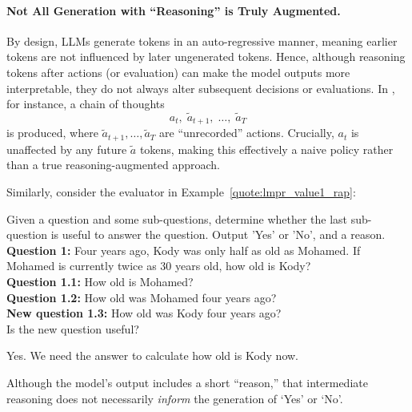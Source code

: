 \paragraph{Not All Generation with ``Reasoning'' is Truly Augmented.}
By design, LLMs generate tokens in an auto-regressive manner, meaning earlier tokens are not influenced by later ungenerated tokens. Hence, although reasoning tokens after actions (or evaluation) can make the model outputs more interpretable, they do not always alter subsequent decisions or evaluations. 
In \citet{xie2023selfevaluation}, for instance, a chain of thoughts
\[
    a_t,\;\tilde{a}_{t+1},\; \ldots,\;\tilde{a}_T
\]
is produced, where $\tilde{a}_{t+1}, \ldots, \tilde{a}_T$ are ``unrecorded'' actions. Crucially, $a_t$ is unaffected by any future $\tilde{a}$ tokens, making this effectively a naive policy rather than a true reasoning-augmented approach.

Similarly, consider the evaluator in Example~\ref{quote:lmpr_value1_rap}:
\begin{numberedquote}
    Given a question and some sub-questions, determine whether the last sub-question is useful to answer the question. Output 'Yes' or 'No', and a reason. \\
    \textbf{Question 1:} Four years ago, Kody was only half as old as Mohamed. If Mohamed is currently twice as 30 years old, how old is Kody? \\
    \textbf{Question 1.1:} How old is Mohamed? \\
    \textbf{Question 1.2:} How old was Mohamed four years ago? \\
    \textbf{New question 1.3:} How old was Kody four years ago? \\
    Is the new question useful? 
    \begin{myshadowbox}
    Yes. We need the answer to calculate how old is Kody now. 
    \end{myshadowbox}
\label{quote:lmpr_value1_rap}
\end{numberedquote}
Although the model's output includes a short ``reason,'' that intermediate reasoning does not necessarily \emph{inform} the generation of `Yes’ or `No’.